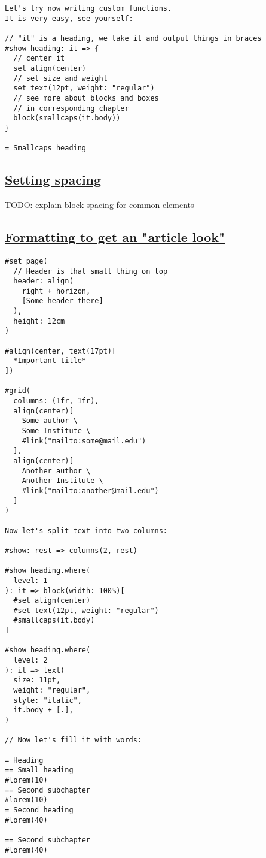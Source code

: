 \begin{verbatim}
Let's try now writing custom functions.
It is very easy, see yourself:

// "it" is a heading, we take it and output things in braces
#show heading: it => {
  // center it
  set align(center)
  // set size and weight
  set text(12pt, weight: "regular")
  // see more about blocks and boxes
  // in corresponding chapter
  block(smallcaps(it.body))
}

= Smallcaps heading
\end{verbatim}

\pandocbounded{}

\subsection{\texorpdfstring{\hyperref[setting-spacing]{Setting
spacing}}{Setting spacing}}\label{setting-spacing}

TODO: explain block spacing for common elements

\subsection{\texorpdfstring{\hyperref[formatting-to-get-an-article-look]{Formatting
to get an "article
look"}}{Formatting to get an "article look"}}\label{formatting-to-get-an-article-look}

\begin{verbatim}
#set page(
  // Header is that small thing on top
  header: align(
    right + horizon,
    [Some header there]
  ),
  height: 12cm
)

#align(center, text(17pt)[
  *Important title*
])

#grid(
  columns: (1fr, 1fr),
  align(center)[
    Some author \
    Some Institute \
    #link("mailto:some@mail.edu")
  ],
  align(center)[
    Another author \
    Another Institute \
    #link("mailto:another@mail.edu")
  ]
)

Now let's split text into two columns:

#show: rest => columns(2, rest)

#show heading.where(
  level: 1
): it => block(width: 100%)[
  #set align(center)
  #set text(12pt, weight: "regular")
  #smallcaps(it.body)
]

#show heading.where(
  level: 2
): it => text(
  size: 11pt,
  weight: "regular",
  style: "italic",
  it.body + [.],
)

// Now let's fill it with words:

= Heading
== Small heading
#lorem(10)
== Second subchapter
#lorem(10)
= Second heading
#lorem(40)

== Second subchapter
#lorem(40)
\end{verbatim}


